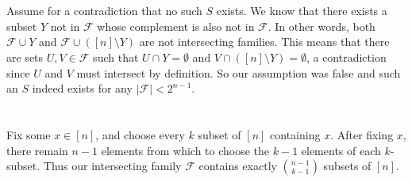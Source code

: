 \documentclass{article}
\begin{document}
\section{} %
Assume for a contradiction that no such $S$ exists. We know that there exists a
subset $Y$ not in $\mathcal{F}$ whose complement is also not in $\mathcal{F}$.
In other words, both $\mathcal{F}\cup Y$ and $\mathcal{F}\cup([n]\setminus Y)$
are not intersecting families. This means that there are sets $U,V\in\mathcal{F}$
such that $U\cap Y=\emptyset$ and $V\cap([n]\setminus Y)=\emptyset$, a
contradiction since $U$ and $V$ must intersect by definition. So our assumption
was false and such an $S$ indeed exists for any $|\mathcal{F}|<2^{n-1}$.
\section{} %
Fix some $x\in[n]$, and choose every $k$ subset of $[n]$ containing $x$. After
fixing $x$, there remain $n-1$ elements from which to choose the $k-1$ elements
of each $k$-subset. Thus our intersecting family $\mathcal{F}$ contains exactly
$\binom{n-1}{k-1}$ subsets of $[n]$.
\end{document}
